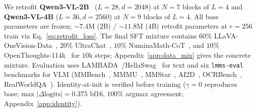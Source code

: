 \documentclass{article}
\begin{document}
We retrofit \textbf{Qwen3-VL-2B}~\citep{bai2025qwen3vl} ($L{=}28, d{=}2048$) at $N{=}7$ blocks of $L{=}4$ and \textbf{Qwen3-VL-4B} ($L{=}36, d{=}2560$) at $N{=}9$ blocks of $L{=}4$. All base parameters are frozen; $\sim$$7.4$M ($2$B) / $\sim$$11.8$M ($4$B) retrofit parameters at $r{=}256$ train via Eq.~\ref{eq:retrofit_loss}. The final SFT mixture contains $60\%$ LLaVA-OneVision-Data~\citep{li2024llavaonevision}, $20\%$ UltraChat~\citep{ding2023ultrachat}, $10\%$ NuminaMath-CoT~\citep{aimo2024numinamath}, and $10\%$ OpenThoughts-114k~\citep{guha2025openthoughts} for $10$k steps; Appendix~\ref{app:data_mix} gives the concrete mixture. Evaluation uses LAMBADA~\citep{paperno2016lambada}/HellaSwag~\citep{zellers2019hellaswag} for text and six \texttt{lmms-eval} benchmarks for VLM (MMBench~\citep{liu2023mmbench}, MMMU~\citep{yue2024mmmu}, MMStar~\citep{chen2024mmstar}, AI2D~\citep{kembhavi2016ai2d}, OCRBench~\citep{liu2024ocrbench}, RealWorldQA~\citep{grok2024realworldqa}). Identity-at-init is verified before training ($\gamma{=}0$ reproduces base; max $|\Delta\text{logits}|=0.375$ bf16, $100\%$ argmax agreement; Appendix~\ref{app:identity}).
\end{document}
